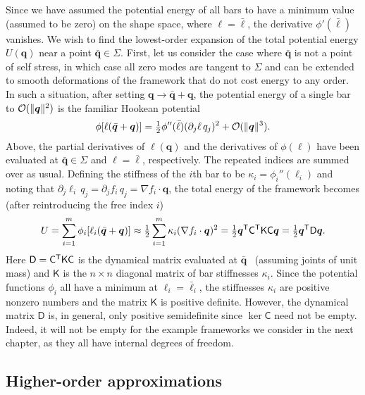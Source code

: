 Since we have assumed the potential energy of all bars to have a minimum value (assumed to be zero) on the shape space, where $\ell = \bar{\ell}$, the derivative $\phi'(\bar{\ell})$ vanishes.
We wish to find the lowest-order expansion of the total potential energy $U(\bm{q})$ near a point $\bar{\bm{q}} \in \Sigma$.
First, let us consider the case where $\bar{\bm{q}}$ is not a point of self stress, in which case all zero modes are tangent to $\Sigma$ and can be extended to smooth deformations of the framework that do not cost energy to any order.
In such a situation, after setting $\bm{q} \to \bar{\bm{q}} + \bm{q}$, the potential energy of a single bar to $\mathcal{O}(\lVert\bm{q}\rVert^2)$ is the familiar Hookean potential
%
\begin{equation}
  \phi[\ell(\bar{\bm{q}} + \bm{q})] =  \tfrac{1}{2}\phi''(\bar{\ell})(\partial_j \ell\,q_j)^2 + \mathcal{O}(\lVert\bm{q}\rVert^3).
\end{equation}
%
Above, the partial derivatives of $\ell(\bm{q})$ and the derivatives of $\phi(\ell)$ have been evaluated at $\bar{\bm{q}} \in \Sigma$ and $\ell = \bar{\ell}$, respectively.
The repeated indices are summed over as usual.
Defining the stiffness of the $i$th bar to be $\kappa_{i} = \phi_{i}''(\ell_{i})$ and noting that $\partial_{j}\ell_{i}\,q_{j} = \partial_{j}f_{i}\,q_{j} = \nabla f_{i}\cdot\bm{q}$, the total energy of the framework becomes (after reintroducing the free index $i$)
%
\begin{equation}
  U = \sum_{i=1}^m \phi_i[\ell_i(\bar{\bm{q}} + \bm{q})] \approx \tfrac{1}{2} \sum_{i=1}^m \kappa_i (\nabla f_i\cdot\bm{q})^2 = \tfrac{1}{2}\bm{q}^\mathsf{T}\mathsf{C}^\mathsf{T}\mathsf{K}\mathsf{C}\bm{q} = \tfrac{1}{2}\bm{q}^\mathsf{T}\mathsf{D}\bm{q}.
  \label{eq:regenergy}
\end{equation}
%
Here $\mathsf{D} = \mathsf{C}^\mathsf{T}\mathsf{K}\mathsf{C}$ is the dynamical matrix evaluated at $\bar{\bm{q}}$~\cite{lubensky2015} (assuming joints of unit mass) and $\mathsf{K}$ is the $n\times n$ diagonal matrix of bar stiffnesses $\kappa_{i}$.
Since the potential functions $\phi_{i}$ all have a minimum at $\ell_{i} = \bar{\ell}_{i}$, the stiffnesses $\kappa_{i}$ are positive nonzero numbers and the matrix $\mathsf{K}$ is positive definite.
However, the dynamical matrix $\mathsf{D}$ is, in general, only positive semidefinite since $\ker \mathsf{C}$ need not be empty.
Indeed, it will not be empty for the example frameworks we consider in the next chapter, as they all have internal degrees of freedom.

\subsection{Higher-order approximations}

